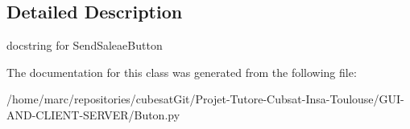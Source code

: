 \subsection{Detailed Description}
\begin{DoxyVerb}docstring for SendSaleaeButton\end{DoxyVerb}
 

The documentation for this class was generated from the following file\+:\begin{DoxyCompactItemize}
\item 
/home/marc/repositories/cubesat\+Git/\+Projet-\/\+Tutore-\/\+Cubsat-\/\+Insa-\/\+Toulouse/\+G\+U\+I-\/\+A\+N\+D-\/\+C\+L\+I\+E\+N\+T-\/\+S\+E\+R\+V\+E\+R/Buton.\+py\end{DoxyCompactItemize}
